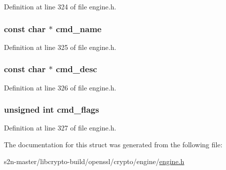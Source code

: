 Definition at line 324 of file engine.\+h.

\subsubsection[{\texorpdfstring{cmd\+\_\+name}{cmd_name}}]{\setlength{\rightskip}{0pt plus 5cm}const char $\ast$ cmd\+\_\+name}\hypertarget{struct_e_n_g_i_n_e___c_m_d___d_e_f_n__st_a5bf0dad269963c63521e5d4d4f200171}{}\label{struct_e_n_g_i_n_e___c_m_d___d_e_f_n__st_a5bf0dad269963c63521e5d4d4f200171}


Definition at line 325 of file engine.\+h.

\subsubsection[{\texorpdfstring{cmd\+\_\+desc}{cmd_desc}}]{\setlength{\rightskip}{0pt plus 5cm}const char $\ast$ cmd\+\_\+desc}\hypertarget{struct_e_n_g_i_n_e___c_m_d___d_e_f_n__st_a5c2bb1b71312989ec0e42cd5ecdb78f6}{}\label{struct_e_n_g_i_n_e___c_m_d___d_e_f_n__st_a5c2bb1b71312989ec0e42cd5ecdb78f6}


Definition at line 326 of file engine.\+h.

\subsubsection[{\texorpdfstring{cmd\+\_\+flags}{cmd_flags}}]{\setlength{\rightskip}{0pt plus 5cm}unsigned int cmd\+\_\+flags}\hypertarget{struct_e_n_g_i_n_e___c_m_d___d_e_f_n__st_a5c4cbcd3ad212dd2f79706a4efd9b9c2}{}\label{struct_e_n_g_i_n_e___c_m_d___d_e_f_n__st_a5c4cbcd3ad212dd2f79706a4efd9b9c2}


Definition at line 327 of file engine.\+h.



The documentation for this struct was generated from the following file\+:\begin{DoxyCompactItemize}
\item 
s2n-\/master/libcrypto-\/build/openssl/crypto/engine/\hyperlink{crypto_2engine_2engine_8h}{engine.\+h}\end{DoxyCompactItemize}
